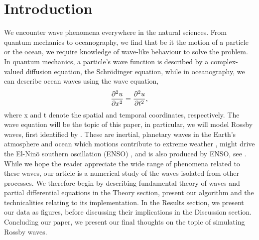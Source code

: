 \section{Introduction}
\label{sec:introduction}

We encounter wave phenomena everywhere in the natural sciences. From quantum mechanics to oceanography, we find that be it the motion of a particle or the ocean, we require knowledge of wave-like behaviour to solve the problem. In quantum mechanics, a particle's wave function is described by a complex-valued diffusion equation, the Schrödinger equation, while in oceanography, we can describe ocean waves using the wave equation,
	\begin{equation}
	\label{eq:wave}
	\pdv[2]{u}{x} = \pdv[2]{u}{t},
	\end{equation}
where x and t denote the spatial and temporal coordinates, respectively. The wave equation will be the topic of this paper, in particular, we will model Rossby waves, first identified by \citet{rossby}. These are inertial, planetary waves in the Earth's atmosphere and ocean which motions contribute to extreme weather \citep{mann2017influence}, might drive the El-Ninõ southern oscillation (ENSO) \citep{bosc2008observed}, and is also produced by ENSO, see \citet{battisti1989role}. While we hope the reader appreciate the wide range of phenomena related to these waves, our article is a numerical study of the waves isolated from other processes. We therefore begin by describing fundamental theory of waves and partial differential equations in the Theory section, present our algorithm and the technicalities relating to its implementation. In the Results section, we present our data as figures, before discussing their implications in the Discussion section. Concluding our paper, we present our final thoughts on the topic of simulating Rossby waves.